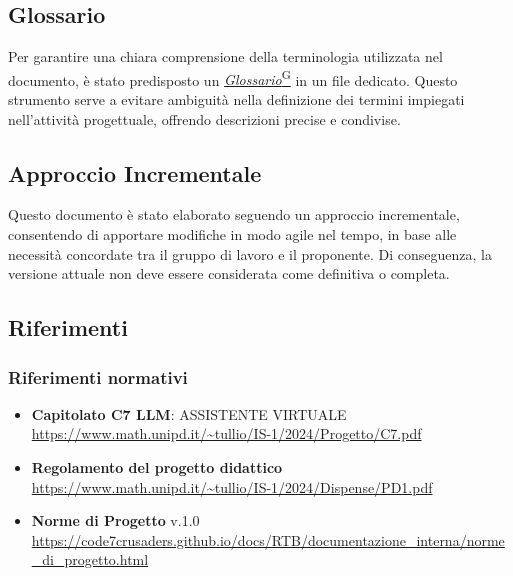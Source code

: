 \subsection{Glossario}
Per garantire una chiara comprensione della terminologia utilizzata nel documento,
è stato predisposto un \href{https://code7crusaders.github.io/docs/PB/documentazione_interna/glossario.html#glossario}{\emph{Glossario}\textsuperscript{G}} in un file dedicato. Questo strumento 
serve a evitare ambiguità nella definizione dei termini impiegati nell’attività progettuale, 
offrendo descrizioni precise e condivise. 

\subsection{Approccio Incrementale}
Questo documento è stato elaborato seguendo un approccio incrementale, 
consentendo di apportare modifiche in modo agile nel tempo, 
in base alle necessità concordate tra il gruppo di lavoro e il proponente. Di conseguenza, 
la versione attuale non deve essere considerata come definitiva o completa.

\subsection{Riferimenti}
\subsubsection{Riferimenti normativi}
\begin{itemize}
    \item \textbf{Capitolato C7 LLM}: ASSISTENTE VIRTUALE \\ \url{https://www.math.unipd.it/~tullio/IS-1/2024/Progetto/C7.pdf}
    \item \textbf{Regolamento del progetto didattico} \\ \url{https://www.math.unipd.it/~tullio/IS-1/2024/Dispense/PD1.pdf}
    \item \textbf{Norme di Progetto} v.1.0 \\ \url{https://code7crusaders.github.io/docs/RTB/documentazione_interna/norme_di_progetto.html}
\end{itemize}

